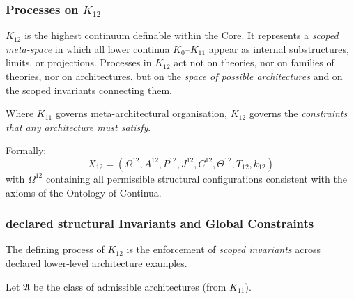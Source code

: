 

\subsubsection{Processes on $K_{12}$}
\label{sec:processes-k12}

$K_{12}$ is the highest continuum definable within the Core.
It represents a \emph{scoped meta-space} in which all lower continua
$K_0$--$K_{11}$ appear as internal substructures, limits, or projections.
Processes in $K_{12}$ act not on theories, nor on families of theories,
nor on architectures, but on the \emph{space of possible architectures}
and on the scoped invariants connecting them.

Where $K_{11}$ governs meta-architectural organisation,
$K_{12}$ governs the \emph{constraints that any architecture must satisfy}.

Formally:
\[
X_{12} = (\Omega^{12}, A^{12}, P^{12}, J^{12},
          C^{12}, \Theta^{12}, T_{12}, k_{12})
\]
with $\Omega^{12}$ containing all permissible structural configurations
consistent with the axioms of the Ontology of Continua.

\subsubsection{declared structural Invariants and Global Constraints}

The defining process of $K_{12}$ is the enforcement of
\emph{scoped invariants} across declared lower-level architecture examples.

Let $\mathfrak{A}$ be the class of admissible architectures
(from $K_{11}$).

